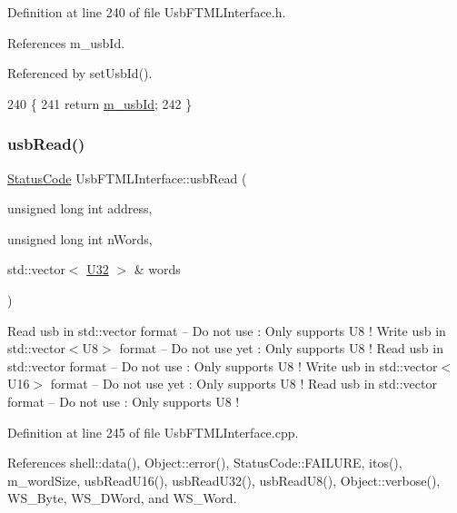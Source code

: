 Definition at line 240 of file Usb\+F\+T\+M\+L\+Interface.\+h.



References m\+\_\+usb\+Id.



Referenced by set\+Usb\+Id().


\begin{DoxyCode}
240                \{
241     \textcolor{keywordflow}{return} \hyperlink{classUsbFTMLInterface_aab6754587c303660d5c498ce34a2b4c8}{m\_usbId};
242   \}
\end{DoxyCode}
\mbox{\label{classUsbFTMLInterface_adbedf78154f460303edc20420c22c333}} 
\subsubsection{\texorpdfstring{usb\+Read()}{usbRead()}}
{\footnotesize\ttfamily \hyperlink{classStatusCode}{Status\+Code} Usb\+F\+T\+M\+L\+Interface\+::usb\+Read (\begin{DoxyParamCaption}\item[{unsigned long int}]{address,  }\item[{unsigned long int}]{n\+Words,  }\item[{std\+::vector$<$ \hyperlink{classUsbFTMLInterface_a142f8ce4b5873c295af8945f3894ae38}{U32} $>$ \&}]{words }\end{DoxyParamCaption})}

Read usb in std\+::vector format -- Do not use \+: Only supports U8 ! Write usb in std\+::vector$<$\+U8$>$ format -- Do not use yet \+: Only supports U8 ! Read usb in std\+::vector format -- Do not use \+: Only supports U8 ! Write usb in std\+::vector$<$\+U16$>$ format -- Do not use yet \+: Only supports U8 ! Read usb in std\+::vector format -- Do not use \+: Only supports U8 ! 

Definition at line 245 of file Usb\+F\+T\+M\+L\+Interface.\+cpp.



References shell\+::data(), Object\+::error(), Status\+Code\+::\+F\+A\+I\+L\+U\+RE, itos(), m\+\_\+word\+Size, usb\+Read\+U16(), usb\+Read\+U32(), usb\+Read\+U8(), Object\+::verbose(), W\+S\+\_\+\+Byte, W\+S\+\_\+\+D\+Word, and W\+S\+\_\+\+Word.




